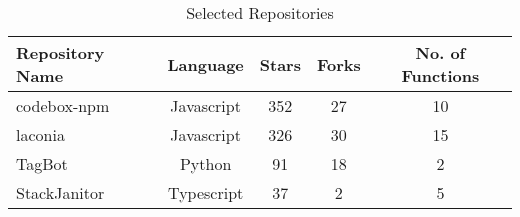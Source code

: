 \begin{table}[h!]
    \centering
    \begin{tabular}{|l|c|c|c|c|}
        \hline
        \textbf{Repository Name} & \textbf{Language} & \textbf{Stars} & \textbf{Forks} & \textbf{No. of Functions} \\
        \hline
        codebox-npm & Javascript & 352 & 27 & 10 \\
        \hline
        laconia & Javascript & 326 & 30 & 15 \\
        \hline
        TagBot & Python & 91 & 18 & 2 \\
        \hline
        StackJanitor & Typescript & 37 & 2 & 5 \\
        \hline
    \end{tabular}
    \vspace{1mm}
    \caption{Selected Repositories}
    \label{tab:repo-info}
    \vspace{-15pt}
\end{table}